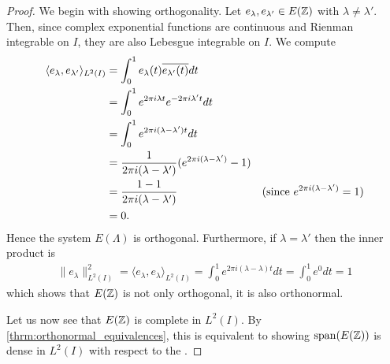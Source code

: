 \documentclass[../thesis.tex]{subfiles}
\begin{document}
\begin{proof}%
    We begin with showing orthogonality. Let $e_{\lambda}, e_{\lambda'} \in E(\mathbb{Z})$ with $\lambda \neq \lambda'$. Then, since complex exponential functions are continuous and Rienman integrable on $I$, they are also Lebesgue integrable on $I$. We compute
    \begin{align}\label{eq:orthog_one_dim_req}
        \langle e_{\lambda},e_{\lambda'} \rangle_{L^2(I)} &= \int_0^1 e_{\lambda}(t)\overline{e_{\lambda'}(t)} dt \nonumber\\ 
        &= \int_0^1 e^{2 \pi i {\lambda}t} e^{-2 \pi i {\lambda'}t} dt \nonumber\\
        &= \int_0^1 e^{2 \pi i (\lambda-\lambda')t} dt \nonumber\\
        &=\frac{1}{2 \pi i (\lambda-\lambda')} (e^{2 \pi i (\lambda - \lambda')} -1) \\
        &=\frac{1-1}{2 \pi i (\lambda-\lambda')} & (\text{since } e^{2 \pi i (\lambda-\lambda')} = 1) \nonumber\\
        &= 0 \nonumber.
    \end{align}
    Hence the system $E(\Lambda)$ is orthogonal. Furthermore, if $\lambda =\lambda'$ then the inner product is
    \begin{align*}\label{eq:exp_norm_one}
        \| e_\lambda \|^2_{L^2(I)} 
        = \langle e_{\lambda},e_{\lambda} \rangle_{L^2(I)} 
        = \int_0^1 e^{2 \pi i (\lambda-\lambda)t} dt
        = \int_0^1 e^{0} dt = 1
    \end{align*}
    which shows that $E(\mathbb{Z})$ is not only orthogonal, it is also orthonormal. 

    Let us now see that $E(\mathbb{Z})$ is complete in $L^2(I)$. By \cref{thrm:orthonormal_equivalences}, this is equivalent to showing $\operatorname{span}(E(\mathbb{Z}))$ is dense in $L^2(I)$ with respect to the \Ltwonorm. 


\end{proof}
\end{document}

